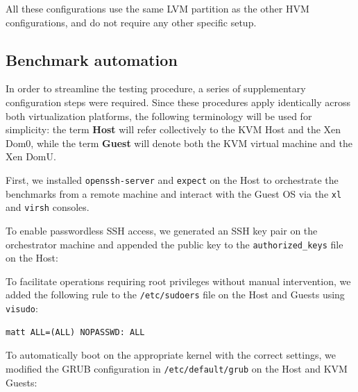 All these configurations use the same LVM partition as the other HVM
configurations, and do not require any other specific setup.

\subsection{Benchmark automation}\label{benchmark-automation}

In order to streamline the testing procedure, a series of supplementary
configuration steps were required. Since these procedures apply
identically across both virtualization platforms, the following
terminology will be used for simplicity: the term \textbf{Host} will
refer collectively to the KVM Host and the Xen Dom0, while the term
\textbf{Guest} will denote both the KVM virtual machine and the Xen
DomU.

First, we installed \texttt{openssh-server} and \texttt{expect} on the
Host to orchestrate the benchmarks from a remote machine and interact
with the Guest OS via the \texttt{xl} and \texttt{virsh} consoles.

\begin{Shaded}
\begin{Highlighting}[]
\end{Highlighting}
\end{Shaded}

To enable passwordless SSH access, we generated an SSH key pair on the
orchestrator machine and appended the public key to the
\texttt{authorized\_keys} file on the Host:

\begin{Shaded}
\begin{Highlighting}[]
\end{Highlighting}
\end{Shaded}

To facilitate operations requiring root privileges without manual
intervention, we added the following rule to the \texttt{/etc/sudoers}
file on the Host and Guests using \texttt{visudo}:

\begin{Verbatim}[breaklines=true,breakanywhere=true]
matt ALL=(ALL) NOPASSWD: ALL
\end{Verbatim}

To automatically boot on the appropriate kernel with the correct
settings, we modified the GRUB configuration in
\texttt{/etc/default/grub} on the Host and KVM Guests:


